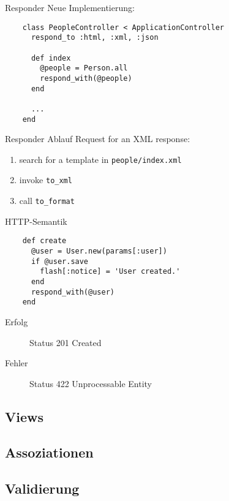 \begin{frame}[fragile]{Responder}
  Neue Implementierung:
  \begin{lstlisting}
    class PeopleController < ApplicationController
      respond_to :html, :xml, :json

      def index
        @people = Person.all
        respond_with(@people)
      end

      ...
    end
  \end{lstlisting}
\end{frame}

\begin{frame}{Responder Ablauf}
  Request for an XML response:
  \begin{enumerate}
    \item search for a template in \lstinline|people/index.xml|
    \item invoke \lstinline|to_xml|
    \item call \lstinline|to_format|
  \end{enumerate}
\end{frame}

\begin{frame}[fragile]{HTTP-Semantik}
  \begin{lstlisting}
    def create
      @user = User.new(params[:user])
      if @user.save
        flash[:notice] = 'User created.'
      end
      respond_with(@user)
    end
  \end{lstlisting}

  \begin{description}
    \item[Erfolg] Status 201 Created
    \item[Fehler] Status 422 Unprocessable Entity
  \end{description}
\end{frame}

\subsection{Views}


\subsection{Assoziationen}


\subsection{Validierung}



